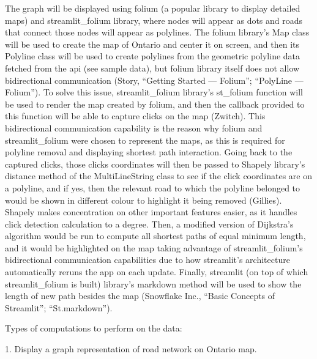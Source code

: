 \documentclass[fontsize=11pt]{article}
\begin{document}
The graph will be displayed using folium (a popular library to display detailed maps) and streamlit\_folium library, where nodes will appear as dots and roads that connect those nodes will appear as polylines. The folium library's Map class will be used to create the map of Ontario and center it on screen, and then its Polyline class will be used to create polylines from the geometric polyline data fetched from the api (see sample data), but folium library itself does not allow bidirectional communication (Story, “Getting Started — Folium”; “PolyLine — Folium”). To solve this issue, streamlit\_folium library's st\_folium function will be used to render the map created by folium, and then the callback provided to this function will be able to capture clicks on the map (Zwitch). This bidirectional communication capability is the reason why folium and streamlit\_folium were chosen to represent the maps, as this is required for polyline removal and displaying shortest path interaction. Going back to the captured clicks, those clicks coordinates will then be passed to Shapely library's distance method of the MultiLineString class to see if the click coordinates are on a polyline, and if yes, then the relevant road to which the polyline belonged to would be shown in different colour to highlight it being removed (Gillies). Shapely makes concentration on other important features easier, as it handles click detection calculation to a degree. Then, a modified version of Dijkstra's algorithm would be run to compute all shortest paths of equal minimum length, and it would be highlighted on the map taking advantage of streamlit\_folium's bidirectional communication capabilities due to how streamlit's architecture automatically reruns the app on each update. Finally, streamlit (on top of which streamlit\_folium is built) library's markdown method will be used to show the length of new path besides the map (Snowflake Inc., “Basic Concepts of Streamlit”; “St.markdown”).

Types of computations to perform on the data:

1. Display a graph representation of road network on Ontario map.
\end{document}
